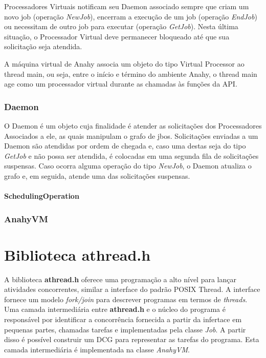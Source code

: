 \documentclass[12pt]{article} usepackage{sbc-template} usepackage{graphicx,url}
\begin{document}
Processadores Virtuais notificam seu Daemon associado sempre que criam um novo job (operação \textit{NewJob}), encerram a execução de um job (operação \textit{EndJob}) ou necessitam de outro job para executar (operação \textit{GetJob}). Nesta última situação, o Processador Virtual deve permanecer bloqueado até que sua solicitação seja atendida.

A máquina virtual de Anahy associa um objeto do tipo Virtual Processor ao thread main, ou seja, entre o início e término do ambiente Anahy, o thread main age como um processador virtual durante as chamadas às funções da API.

\subsubsection{Daemon}

O Daemon é um objeto cuja finalidade é atender as solicitações dos Processadores Associados a ele, as quais manipulam o grafo de jbos. Solicitações enviadas a um Daemon são atendidas por ordem de chegada e, caso uma destas seja do tipo \textit{GetJob} e não possa ser atendida, é colocadas em uma segunda fila de solicitações suspensas. Caso ocorra alguma operação do tipo \textit{NewJob}, o Daemon atualiza o grafo e, em seguida, atende uma das solicitações suspensas.

\paragraph{SchedulingOperation}


\subsubsection{AnahyVM}



\section{Biblioteca athread.h} %
\label{sec:athread}

A biblioteca \textbf{athread.h} oferece uma programação a alto nível para lançar atividades concorrentes, similar a interface do 
padrão POSIX Thread. A interface fornece um modelo \emph{fork/join} para descrever programas em termos de \emph{threads}. Uma 
camada intermediária entre \textbf{athread.h} e o núcleo do programa é responsável por identificar a concorrência fornecida 
a partir da infertace em pequenas partes, chamadas tarefas e implementadas pela classe \emph{Job}. A partir disso é possível
construir um DCG para representar as tarefas do programa. Esta camada intermediária é implementada na classe \emph{AnahyVM}.
\end{document}
